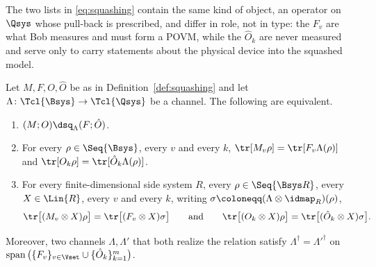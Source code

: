 
The two lists in \eqref{eq:squashing} contain the same kind of object, an
operator on $\Qsys$ whose pull-back is prescribed, and differ in role, not in
type: the $F_v$ are what Bob measures and must form a POVM, while the
$\hat O_k$ are never measured and serve only to carry statements about the
physical device into the squashed model.

\begin{lemma}\label{lem:statistics}
Let $M,F,O,\hat O$ be as in Definition~\ref{def:squashing} and let
$\Lambda\colon\Tcl{\Bsys}\to\Tcl{\Qsys}$ be a channel. The following are
equivalent.
\begin{enumerate}[label=(\roman*),leftmargin=3.0em]
\item $(M;O)\dsq_{\Lambda}(F;\hat O)$.
\item For every $\rho\in\Seq{\Bsys}$, every $v$ and every $k$,
  $\tr[M_v\rho]=\tr[F_v\Lambda(\rho)]$ and
  $\tr[O_k\rho]=\tr[\hat O_k\Lambda(\rho)]$.
\item For every finite-dimensional side system $R$, every
  $\rho\in\Seq{\Bsys R}$, every $X\in\Lin{R}$, every $v$ and every $k$, writing
  $\sigma\coloneqq(\Lambda\otimes\idmap_R)(\rho)$,
  \begin{equation*}
    \tr\big[(M_v\otimes X)\rho\big]=\tr\big[(F_v\otimes X)\sigma\big]
    \qquad\text{and}\qquad
    \tr\big[(O_k\otimes X)\rho\big]=\tr\big[(\hat O_k\otimes X)\sigma\big].
  \end{equation*}
\end{enumerate}
Moreover, two channels $\Lambda,\Lambda'$ that both realize the relation
satisfy $\Lambda^{\dagger}=\Lambda'^{\dagger}$ on
$\operatorname{span}\big(\{F_v\}_{v\in\Vset}\cup\{\hat O_k\}_{k=1}^{m}\big)$.
\end{lemma}

